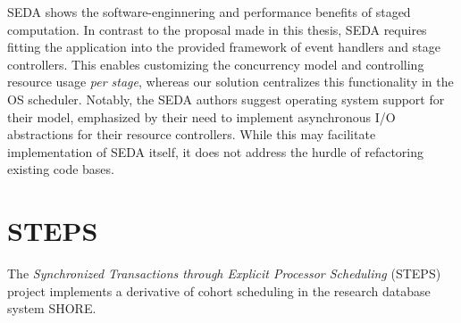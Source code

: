 \documentclass[12pt,a4paper]{book}
\begin{document}
SEDA shows the software-enginnering and performance benefits of staged computation.
In contrast to the proposal made in this thesis, SEDA requires fitting the application into the provided framework of event handlers and stage controllers.
This enables customizing the concurrency model and controlling resource usage \emph{per stage}, whereas our solution centralizes this functionality in the OS scheduler.
Notably, the SEDA authors suggest operating system support for their model, emphasized by their need to implement asynchronous I/O abstractions for their resource controllers.
While this may facilitate implementation of SEDA itself, it does not address the hurdle of refactoring existing code bases.

\section{STEPS}\label{ch:relwork:steps}

The \emph{Synchronized Transactions through Explicit Processor Scheduling} (STEPS) project implements a derivative of cohort scheduling in the research database system SHORE.~\cite{shore}
\end{document}
